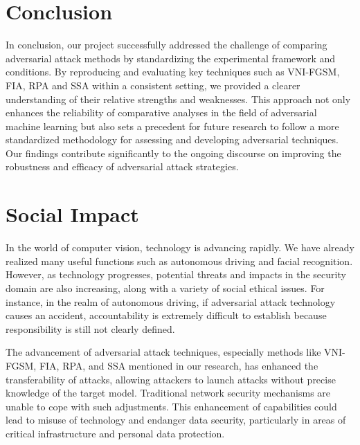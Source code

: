 \section{Conclusion}

In conclusion, our project successfully addressed the challenge of comparing adversarial attack methods by standardizing the experimental framework and conditions. By reproducing and evaluating key techniques such as VNI-FGSM, FIA, RPA and SSA within a consistent setting, we provided a clearer understanding of their relative strengths and weaknesses. This approach not only enhances the reliability of comparative analyses in the field of adversarial machine learning but also sets a precedent for future research to follow a more standardized methodology for assessing and developing adversarial techniques. Our findings contribute significantly to the ongoing discourse on improving the robustness and efficacy of adversarial attack strategies.

{\small


}


\newpage
\section*{Social Impact}
In the world of computer vision, technology is advancing rapidly. We have already realized many useful functions such as autonomous driving and facial recognition. However, as technology progresses, potential threats and impacts in the security domain are also increasing, along with a variety of social ethical issues. For instance, in the realm of autonomous driving, if adversarial attack technology causes an accident, accountability is extremely difficult to establish because responsibility is still not clearly defined.

The advancement of adversarial attack techniques, especially methods like VNI-FGSM, FIA, RPA, and SSA mentioned in our research, has enhanced the transferability of attacks, allowing attackers to launch attacks without precise knowledge of the target model. Traditional network security mechanisms are unable to cope with such adjustments. This enhancement of capabilities could lead to misuse of technology and endanger data security, particularly in areas of critical infrastructure and personal data protection.

